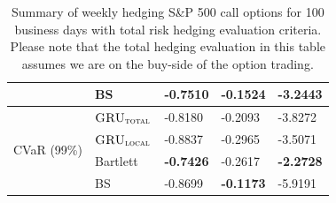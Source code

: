 \documentclass[letterpaper,12pt,titlepage,oneside,final]{book}
\numberwithin{equation}{section}
\theoremstyle{definition}
\newcommand{\modelT}{\textsc{GRU}_{\textsc{total}}}
\newcommand{\modelL}{\textsc{GRU}_{\textsc{local}}}
\begin{document}
\begin{table}[htp!]
\begin{tabular}{ll|l|l|l|}
		\multicolumn{1}{|l|}{}                                & BS            & -0.7510          & \textbf{-0.1524}          & -3.2443 			\\ 
		\hline
		\multicolumn{1}{|l|}{\multirow{4}{*}{CVaR (99\%)}}    & $\modelT$     & -0.8180          & -0.2093                   & -3.8272           \\  
		\multicolumn{1}{|l|}{}                                & $\modelL$     & -0.8837 		 & -0.2965  		         & -3.5071          \\  
		\multicolumn{1}{|l|}{}                                & Bartlett      & \textbf{-0.7426} & -0.2617          		 & \textbf{-2.2728}           \\  
		\multicolumn{1}{|l|}{}                                & BS            & -0.8699          & \textbf{-0.1173}          & -5.9191 			\\ 
		\hline
	\end{tabular}
	\caption{Summary of weekly hedging S\&P 500 call options for 100 business days with total risk hedging evaluation criteria. Please note that the total hedging evaluation in this table assumes we are on the buy-side of the option trading.} \label{table:CallTotalWBuy}
\end{table}
\end{document}

